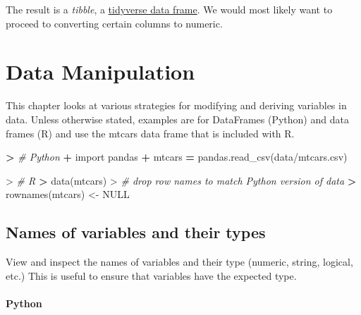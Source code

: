 \documentclass[
]{book}
\newenvironment{Shaded}{\begin{snugshade}}{\end{snugshade}}
\newcommand{\CommentTok}[1]{\textcolor[rgb]{0.56,0.35,0.01}{\textit{#1}}}
\newcommand{\ConstantTok}[1]{\textcolor[rgb]{0.00,0.00,0.00}{#1}}
\newcommand{\ErrorTok}[1]{\textcolor[rgb]{0.64,0.00,0.00}{\textbf{#1}}}
\newcommand{\FunctionTok}[1]{\textcolor[rgb]{0.00,0.00,0.00}{#1}}
\newcommand{\ImportTok}[1]{#1}
\newcommand{\NormalTok}[1]{#1}
\newcommand{\OperatorTok}[1]{\textcolor[rgb]{0.81,0.36,0.00}{\textbf{#1}}}
\newcommand{\OtherTok}[1]{\textcolor[rgb]{0.56,0.35,0.01}{#1}}
\newcommand{\SpecialCharTok}[1]{\textcolor[rgb]{0.00,0.00,0.00}{#1}}
\newcommand{\StringTok}[1]{\textcolor[rgb]{0.31,0.60,0.02}{#1}}
\begin{document}
The result is a \emph{tibble}, a \href{https://tibble.tidyverse.org/}{tidyverse data frame}. We would most likely want to proceed to converting certain columns to numeric.

\hypertarget{data-manipulation}{%
\chapter{Data Manipulation}\label{data-manipulation}}

This chapter looks at various strategies for modifying and deriving variables in data. Unless otherwise stated, examples are for DataFrames (Python) and data frames (R) and use the mtcars data frame that is included with R.

\begin{Shaded}
\begin{Highlighting}[]
\OperatorTok{\textgreater{}} \CommentTok{\# Python}
\OperatorTok{+} \ImportTok{import}\NormalTok{ pandas}
\OperatorTok{+}\NormalTok{ mtcars }\OperatorTok{=}\NormalTok{ pandas.read\_csv(}\StringTok{\textquotesingle{}data/mtcars.csv\textquotesingle{}}\NormalTok{)}
\end{Highlighting}
\end{Shaded}

\begin{Shaded}
\begin{Highlighting}[]
\SpecialCharTok{\textgreater{}} \CommentTok{\# R}
\ErrorTok{\textgreater{}} \FunctionTok{data}\NormalTok{(mtcars)}
\SpecialCharTok{\textgreater{}} \CommentTok{\# drop row names to match Python version of data}
\ErrorTok{\textgreater{}} \FunctionTok{rownames}\NormalTok{(mtcars) }\OtherTok{\textless{}{-}} \ConstantTok{NULL}
\end{Highlighting}
\end{Shaded}

\hypertarget{names-of-variables-and-their-types}{%
\section{Names of variables and their types}\label{names-of-variables-and-their-types}}

View and inspect the names of variables and their type (numeric, string, logical, etc.) This is useful to ensure that variables have the expected type.

\hypertarget{python-14}{%
\subsubsection*{Python}\label{python-14}}
\end{document}
